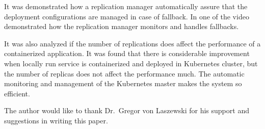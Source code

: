 It was demonstrated how a replication manager automatically assure that the
deployment configurations are managed in case of fallback. In one of the video
demonstrated how the replication manager monitors and handles fallbacks.

It was also analyzed if the number of replications does affect the performance
of a containerized application. It was found that there is considerable
improvement when locally run service is containerized and deployed in
Kubernetes cluster, but the number of replicas does not affect the performance
much. The automatic monitoring and management of the Kubernetes master makes
the system so efficient.
\begin{acks}
The author would like to thank Dr.\ Gregor von Laszewski for his support and
suggestions in writing this paper.
\end{acks}





